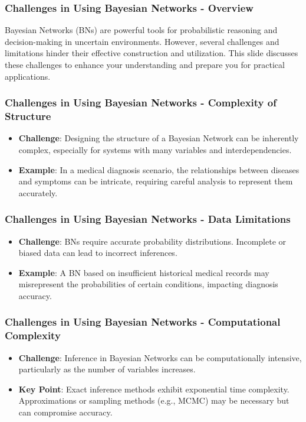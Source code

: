 \documentclass[aspectratio=169]{beamer}
\begin{document}
\begin{frame}[fragile]
    \frametitle{Challenges in Using Bayesian Networks - Overview}
    Bayesian Networks (BNs) are powerful tools for probabilistic reasoning and decision-making in uncertain environments. However, several challenges and limitations hinder their effective construction and utilization. This slide discusses these challenges to enhance your understanding and prepare you for practical applications.
\end{frame}

\begin{frame}[fragile]
    \frametitle{Challenges in Using Bayesian Networks - Complexity of Structure}
    \begin{itemize}
        \item \textbf{Challenge}: Designing the structure of a Bayesian Network can be inherently complex, especially for systems with many variables and interdependencies.
        \item \textbf{Example}: In a medical diagnosis scenario, the relationships between diseases and symptoms can be intricate, requiring careful analysis to represent them accurately.
    \end{itemize}
\end{frame}

\begin{frame}[fragile]
    \frametitle{Challenges in Using Bayesian Networks - Data Limitations}
    \begin{itemize}
        \item \textbf{Challenge}: BNs require accurate probability distributions. Incomplete or biased data can lead to incorrect inferences.
        \item \textbf{Example}: A BN based on insufficient historical medical records may misrepresent the probabilities of certain conditions, impacting diagnosis accuracy.
    \end{itemize}
\end{frame}

\begin{frame}[fragile]
    \frametitle{Challenges in Using Bayesian Networks - Computational Complexity}
    \begin{itemize}
        \item \textbf{Challenge}: Inference in Bayesian Networks can be computationally intensive, particularly as the number of variables increases.
        \item \textbf{Key Point}: Exact inference methods exhibit exponential time complexity. Approximations or sampling methods (e.g., MCMC) may be necessary but can compromise accuracy.
    \end{itemize}
\end{frame}
\end{document}
